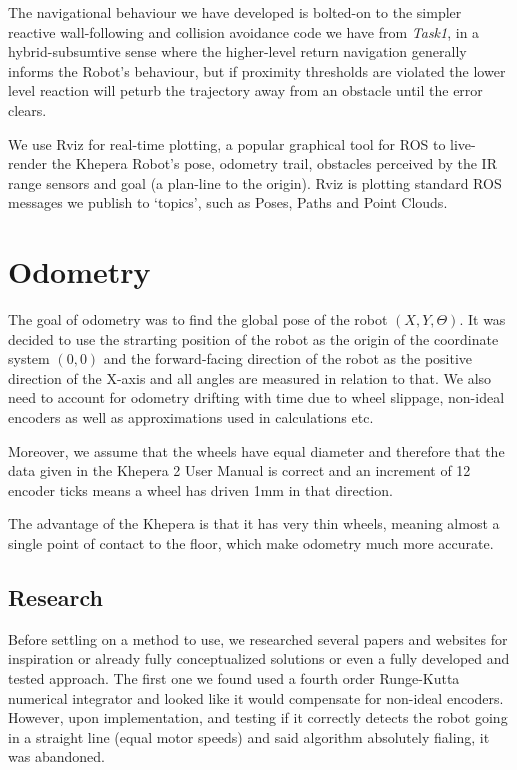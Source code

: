 \documentclass[11pt, a4paper]{article}
\begin{document}
The navigational behaviour we have developed is bolted-on to the simpler reactive wall-following
and collision avoidance code we have from \textit{Task1}, in a hybrid-subsumtive sense where the
higher-level return navigation generally informs the Robot's behaviour, but if proximity thresholds
are violated the lower level reaction will peturb the trajectory away from an obstacle until the
error clears.

We use Rviz for real-time plotting, a popular graphical tool for ROS to live-render the Khepera 
Robot's pose, odometry trail, obstacles perceived by the IR range sensors and goal (a plan-line 
to the origin). Rviz is plotting standard ROS messages we publish to `topics', such as Poses,
Paths and Point Clouds.




\section{Odometry}
\label{Odometry}


The goal of odometry was to find the global pose of the robot ${(X,Y,\Theta)}$. It was decided
to use the strarting position of the robot as the origin of the coordinate system ${(0, 0)}$ 
and the forward-facing direction of the robot as the positive direction of the X-axis and
all angles are measured in relation to that. We also need to account for odometry drifting with
time due to wheel slippage, non-ideal encoders as well as approximations used in calculations etc.

Moreover, we assume that the wheels have equal diameter and therefore that the data given in the 
Khepera 2 User Manual \cite{khepera_manual} is correct and an increment of 12 encoder ticks 
means a wheel has driven 1mm in that direction. 

The advantage of the Khepera is that it has very thin wheels, meaning almost a single point of contact
to the floor, which make odometry much more accurate.

\subsection{Research}

Before settling on a method to use, we researched several papers and websites for inspiration or 
already fully conceptualized solutions or even a fully developed and tested approach. The first one
we found used a fourth order Runge-Kutta numerical integrator \cite{runge_kutta} and looked like 
it would compensate for non-ideal encoders. However, upon implementation, and  testing if it correctly 
detects the robot going in a straight line (equal motor speeds) and said algorithm absolutely fialing,
it was abandoned. 
\end{document}
